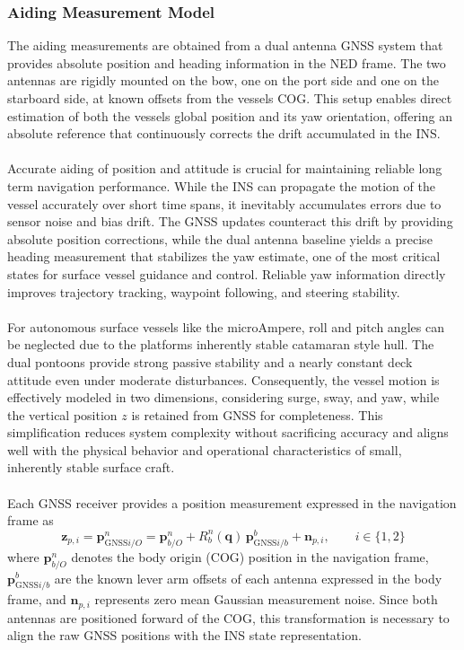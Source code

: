 \subsubsection{Aiding Measurement Model}
The aiding measurements are obtained from a dual antenna GNSS system that provides absolute position and heading information in the NED frame. The two antennas are rigidly mounted on the bow, one on the port side and one on the starboard side, at known offsets from the vessels COG. This setup enables direct estimation of both the vessels global position and its yaw orientation, offering an absolute reference that continuously corrects the drift accumulated in the INS.  
\\ \\
Accurate aiding of position and attitude is crucial for maintaining reliable long term navigation performance. While the INS can propagate the motion of the vessel accurately over short time spans, it inevitably accumulates errors due to sensor noise and bias drift. The GNSS updates counteract this drift by providing absolute position corrections, while the dual antenna baseline yields a precise heading measurement that stabilizes the yaw estimate, one of the most critical states for surface vessel guidance and control. Reliable yaw information directly improves trajectory tracking, waypoint following, and steering stability.  
\\ \\
For autonomous surface vessels like the microAmpere, roll and pitch angles can be neglected due to the platforms inherently stable catamaran style hull. The dual pontoons provide strong passive stability and a nearly constant deck attitude even under moderate disturbances. Consequently, the vessel motion is effectively modeled in two dimensions, considering surge, sway, and yaw, while the vertical position $z$ is retained from GNSS for completeness. This simplification reduces system complexity without sacrificing accuracy and aligns well with the physical behavior and operational characteristics of small, inherently stable surface craft.
\\ \\
Each GNSS receiver provides a position measurement expressed in the navigation frame as
$$
    \mathbf{z}_{p,i} = \mathbf{p}_{\text{GNSS}i/O}^{n}
    = \mathbf{p}_{b/O}^{n} + R_b^n(\mathbf{q})\,\mathbf{p}_{\text{GNSS}i/b}^{b} + \mathbf{n}_{p,i}, 
    \qquad i \in \{1,2\}
$$
where $\mathbf{p}_{b/O}^{n}$ denotes the body origin (COG) position in the navigation frame, $\mathbf{p}_{\text{GNSS}i/b}^{b}$ are the known lever arm offsets of each antenna expressed in the body frame, and $\mathbf{n}_{p,i}$ represents zero mean Gaussian measurement noise. Since both antennas are positioned forward of the COG, this transformation is necessary to align the raw GNSS positions with the INS state representation.  
